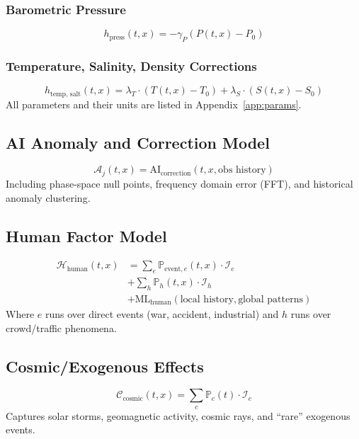 \documentclass[12pt]{article}
\begin{document}
\subsubsection{Barometric Pressure}
\begin{equation}
h_{\text{press}}(t, x) = -\gamma_P (P(t, x) - P_0)
\end{equation}

\subsubsection{Temperature, Salinity, Density Corrections}
\begin{equation}
h_{\text{temp, salt}}(t, x) = \lambda_T \cdot (T(t, x) - T_0) + \lambda_S \cdot (S(t, x) - S_0)
\end{equation}
All parameters and their units are listed in Appendix~\ref{app:params}.

\subsection{AI Anomaly and Correction Model}
\begin{equation}
\mathcal{A}_j(t, x) = \text{AI}_{\text{correction}}(t, x, \text{obs history})
\end{equation}
Including phase-space null points, frequency domain error (FFT), and historical anomaly clustering.

\subsection{Human Factor Model}
\begin{align}
\mathcal{H}_{\text{human}}(t, x) &= \sum_{e} \mathbb{P}_{\text{event}, e}(t, x) \cdot \mathcal{I}_e \nonumber \\
&+ \sum_{h} \mathbb{P}_h(t, x) \cdot \mathcal{I}_h \nonumber \\
&+ \text{ML}_{\text{human}}(\text{local history}, \text{global patterns})
\end{align}
Where $e$ runs over direct events (war, accident, industrial) and $h$ runs over crowd/traffic phenomena.

\subsection{Cosmic/Exogenous Effects}
\begin{equation}
\mathcal{C}_{\text{cosmic}}(t, x) = \sum_{c} \mathbb{P}_c(t) \cdot \mathcal{I}_c
\end{equation}
Captures solar storms, geomagnetic activity, cosmic rays, and “rare” exogenous events.
\end{document}
